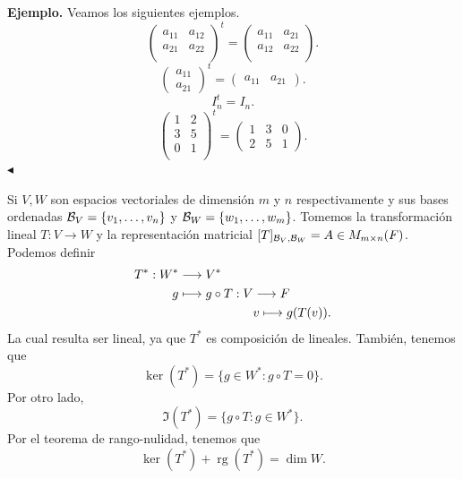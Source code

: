 \documentclass[12pt,a4paper]{book}
\DeclareMathOperator{\rg}{rg}
\newcommand{\llaves}[1]{\{#1\}}
\begin{document}
    \textbf{Ejemplo.} Veamos los siguientes ejemplos.
    \[
    \begin{pmatrix}
        a_{11} & a_{12}\\
        a_{21} & a_{22}\\
    \end{pmatrix}^t = 
    \begin{pmatrix}
        a_{11} & a_{21}\\
        a_{12} & a_{22}\\
    \end{pmatrix}.
    \]
    \[
    \begin{pmatrix}
        a_{11}\\a_{21}
    \end{pmatrix}^t = 
    \begin{pmatrix}
        a_{11} & a_{21}
    \end{pmatrix}.
    \]
    \[
    I_n^t = I_n.
    \]
    \[
    \begin{pmatrix}
        1 & 2\\
        3 & 5\\
        0 & 1\\
    \end{pmatrix}^t =
    \begin{pmatrix}
        1 & 3 & 0\\
        2 & 5 & 1
    \end{pmatrix}.
    \]
    \hfill $\blacktriangleleft$

    Si $V, W$ son espacios vectoriales de dimensión $m$ y $n$ respectivamente y sus bases ordenadas $\BB_V = \llaves{v_1, \dots, v_n}$ y $\BB_W = \llaves{w_1, \dots, w_m}$. Tomemos la transformación lineal $T: V \to W$ y la representación matricial $[T]_{\mathcal{B}_V, \mathcal{B}_W} = A \in M_{m \times n}(F)$. Podemos definir
    \begin{equation*}
        \begin{aligned}
            T^*: W^* & \longrightarrow V^* \\
            g & \longmapsto g \circ T:V\longrightarrow F \\
            &\hspace{2.1cm} v\longmapsto g(T(v)).
        \end{aligned}
    \end{equation*}
    La cual resulta ser lineal, ya que $T^*$ es composición de lineales. También, tenemos que
    \[
    \ker(T^*) = \llaves{g \in W^* : g \circ T = 0}.
    \]
    Por otro lado,
    \[
    \Im (T^*) = \llaves{g \circ T : g \in W^*}.
    \]
    Por el teorema de rango-nulidad, tenemos que
    \[
    \ker (T^*) + \rg (T^*) = \dim W.
    \]
\end{document}
